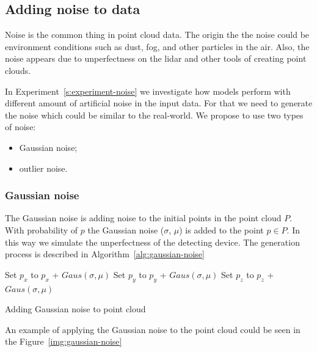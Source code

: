 \subsection{Adding noise to data}
Noise is the common thing in point cloud data. The origin the the noise could be environment conditions such as dust, fog, and other particles in the air. Also, the noise appears due to unperfectness on the lidar and other tools of creating point clouds.

In Experiment~\ref{s:experiment-noise} we investigate how models perform with different amount of artificial noise in the input data. For that we need to generate the noise which could be similar to the real-world. We propose to use two types of noise:
\begin{itemize}
  \item Gaussian noise;
  \item outlier noise.
\end{itemize}

\subsubsection{Gaussian noise}
The Gaussian noise is adding noise to the initial points in the point cloud $P$. With probability of $p$ the Gaussian noise ($\sigma$, $\mu$) is added to the point $p \in P$. In this way we simulate the unperfectness of the detecting device. The generation process is described in Algorithm~\ref{alg:gaussian-noise}

\begin{algorithm}[H]
\label{alg:gaussian-noise}
\SetAlgoLined
{}
 {
     {
        Set $p_x$ to $p_x$ + $Gaus(\sigma, \mu)$ \;
        Set $p_y$ to $p_y$ + $Gaus(\sigma, \mu)$ \;
        Set $p_z$ to $p_z$ + $Gaus(\sigma, \mu)$ \;
    }
}
\caption{Adding Gaussian noise to point cloud \parencite{uchida_tom-uchidaadd_noise_to_point_cloud_2021}}
\end{algorithm}

An example of applying the Gaussian noise to the point cloud could be seen in the Figure~\ref{img:gaussian-noise}

